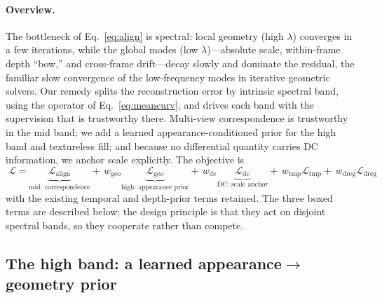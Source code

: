 \documentclass{article}
\begin{document}
\paragraph{Overview.}
The bottleneck of Eq.~\eqref{eq:align} is spectral: local geometry (high
$\lambda$) converges in a few iterations, while the global modes (low
$\lambda$)---absolute scale, within-frame depth ``bow,'' and cross-frame
drift---decay slowly and dominate the residual, the familiar slow convergence
of the low-frequency modes in iterative geometric solvers. Our remedy splits
the reconstruction error by intrinsic spectral band, using the operator of
Eq.~\eqref{eq:meancurv}, and drives each band with the supervision that is
trustworthy there. Multi-view
correspondence is trustworthy in the mid band; we add a learned
appearance-conditioned prior for the high band and textureless fill; and
because no differential quantity carries DC information, we anchor scale
explicitly. The objective is
\begin{equation}
\boxed{\;
\mathcal L=
\underbrace{\mathcal L_{\mathrm{align}}}_{\text{mid: correspondence}}
+\,w_{\mathrm{geo}}\underbrace{\mathcal L_{\mathrm{geo}}}_{\text{high: appearance prior}}
+\,w_{\mathrm{dc}}\underbrace{\mathcal L_{\mathrm{dc}}}_{\text{DC: scale anchor}}
+\,w_{\mathrm{tmp}}\mathcal L_{\mathrm{tmp}}
+\,w_{\mathrm{dreg}}\mathcal L_{\mathrm{dreg}}\; }
\label{eq:total}
\end{equation}
with the existing temporal and depth-prior terms retained. The three boxed
terms are described below; the design principle is that they act on disjoint
spectral bands, so they cooperate rather than compete.

\subsection{The high band: a learned appearance$\to$geometry prior}
\end{document}
